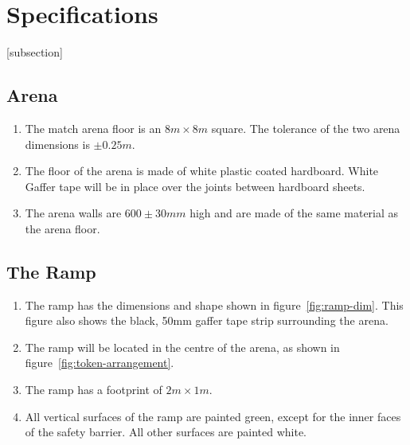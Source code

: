 \section{Specifications}
[subsection]
\newcommand{\rcnii}{\stepcounter{rulei}\arabic{section}.\arabic{subsection}.\arabic{rulei}}
\renewcommand{\labelenumi}{\rcnii}

\subsection{Arena}
\begin{enumerate}
\item The match arena floor is an $8m \times 8m$ square.
 The tolerance of the two arena dimensions is $\pm0.25m$.
\item The floor of the arena is made of white plastic coated hardboard.
 White Gaffer tape will be in place over the joints between hardboard sheets.
\item The arena walls are $600\pm30mm$ high and are made of the same material as the arena floor.
\end{enumerate}

\subsection{The Ramp}
\label{ramp}
\begin {enumerate} 
\item The ramp has the dimensions and shape shown in figure~\ref{fig:ramp-dim}.  This figure also shows the black, 50mm gaffer tape strip surrounding the arena.
\item The ramp will be located in the centre of the arena, as shown in figure~\ref{fig:token-arrangement}.
\item The ramp has a footprint of $2m \times 1m$.
\item All vertical surfaces of the ramp are painted green, except for the inner faces of the safety barrier.  All other surfaces are painted white.
\end {enumerate}

